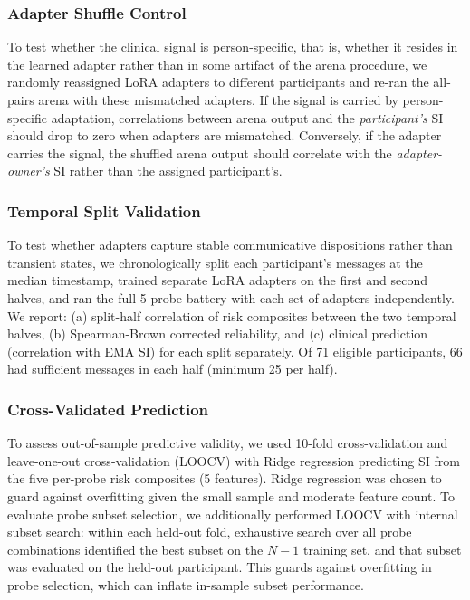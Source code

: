 \documentclass[review,12pt,authoryear]{elsarticle}
\begin{document}
\subsubsection{Adapter Shuffle Control}

To test whether the clinical signal is person-specific, that is, whether it resides in the learned adapter rather than in some artifact of the arena procedure, we randomly reassigned LoRA adapters to different participants and re-ran the all-pairs arena with these mismatched adapters. If the signal is carried by person-specific adaptation, correlations between arena output and the \textit{participant's} SI should drop to zero when adapters are mismatched. Conversely, if the adapter carries the signal, the shuffled arena output should correlate with the \textit{adapter-owner's} SI rather than the assigned participant's.

\subsubsection{Temporal Split Validation}

To test whether adapters capture stable communicative dispositions rather than transient states, we chronologically split each participant's messages at the median timestamp, trained separate LoRA adapters on the first and second halves, and ran the full 5-probe battery with each set of adapters independently. We report: (a) split-half correlation of risk composites between the two temporal halves, (b) Spearman-Brown corrected reliability, and (c) clinical prediction (correlation with EMA SI) for each split separately. Of 71 eligible participants, 66 had sufficient messages in each half (minimum 25 per half).

\subsubsection{Cross-Validated Prediction}

To assess out-of-sample predictive validity, we used 10-fold cross-validation and leave-one-out cross-validation (LOOCV) with Ridge regression predicting SI from the five per-probe risk composites (5 features). Ridge regression was chosen to guard against overfitting given the small sample and moderate feature count. To evaluate probe subset selection, we additionally performed LOOCV with internal subset search: within each held-out fold, exhaustive search over all probe combinations identified the best subset on the $N-1$ training set, and that subset was evaluated on the held-out participant. This guards against overfitting in probe selection, which can inflate in-sample subset performance.
\end{document}
